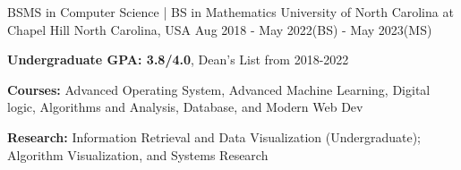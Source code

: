 

\begin{cventries}
\cventry
    {BSMS in Computer Science | BS in Mathematics} %
    {University of North Carolina at Chapel Hill} %
    {North Carolina, USA} %
    {Aug 2018 - May 2022(BS) - May 2023(MS)} %
    {
      \begin{cvitems} %
        \item {\textbf{Undergraduate GPA: 3.8/4.0}, Dean's List from 2018-2022}
        \item {\textbf{Courses:} Advanced Operating System, Advanced Machine Learning, Digital logic, Algorithms and Analysis, Database, and Modern Web Dev}
        \item {\textbf{Research:}  Information Retrieval and Data Visualization (Undergraduate); Algorithm Visualization, and Systems Research}
      \end{cvitems}
    }

\end{cventries}
